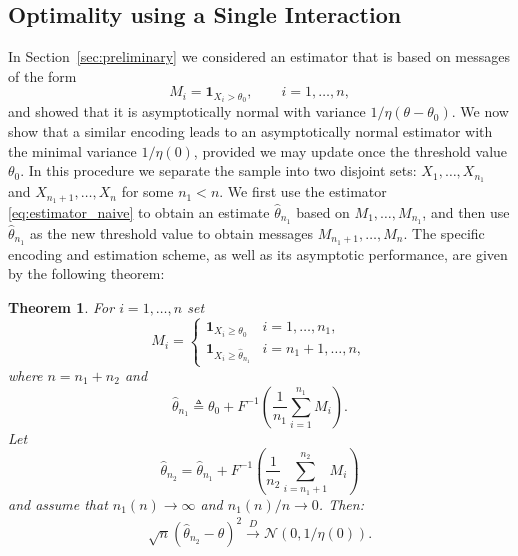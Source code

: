 \documentclass[letterpaper, 11pt]{IEEEtran}      %
\newtheorem{thm}{\bf{Theorem}}
\begin{document}
\subsection{Optimality using a Single Interaction}
In Section~\ref{sec:preliminary} we considered an estimator that is based on messages of the form 
\[
M_i = \mathbf 1_{X_i > \theta_0},\qquad i=1,\ldots,n,
\]
and showed that it is asymptotically normal with variance $1/\eta(\theta-\theta_0)$.
%
We now show that a similar encoding leads to an asymptotically normal estimator with the minimal variance $1/\eta(0)$, provided we may update once the threshold value $\theta_0$. In this procedure we separate the sample into two disjoint sets: $X_1,\ldots,X_{n_1}$ and $X_{n_1+1},\ldots,X_n$ for some $n_1 < n$. We first use the estimator \eqref{eq:estimator_naive} to obtain an estimate $\hat{\theta}_{n_1}$ based on $M_1,\ldots,M_{n_1}$, and then use $\hat{\theta}_{n_1}$ as the new threshold value to obtain messages $M_{n_1+1}, \ldots, M_n$. The specific encoding and estimation scheme, as well as its asymptotic performance, are given by the following theorem:
\begin{thm}
For $i=1,\ldots,n$ set
\[
M_i = \begin{cases}
 \mathbf 1_{X_i \geq \theta_0} & i = 1,\ldots,n_1, \\
 \mathbf 1_{X_i \geq \hat{\theta}_{n_1} }& i={n_1+1,\ldots,n},
\end{cases}
\]
where $n = n_1+ n_2$ and 
\[
\hat{\theta}_{n_1} \triangleq \theta_0 + F^{-1}\left(
\frac{1}{n_1} \sum_{i=1}^{n_1} M_i 
 \right).
\] 
Let 
\[
\hat{\theta}_{n_2}  = \hat{\theta}_{n_1} +  F^{-1} \left( \frac{1}{n_2} \sum_{i=n_1+1}^{n_2} M_i \right)
\]
and assume that $n_1(n) \rightarrow \infty$ and $n_1(n)/n \rightarrow 0$. Then:
\begin{align*}
 \sqrt{n} \left( \hat{\theta}_{n_2} - \theta  \right)^2  \overset{D}{\longrightarrow}  \mathcal N\left( 0, 1/\eta(0) \right).
\end{align*}
\end{thm}
%
%
\end{document}
